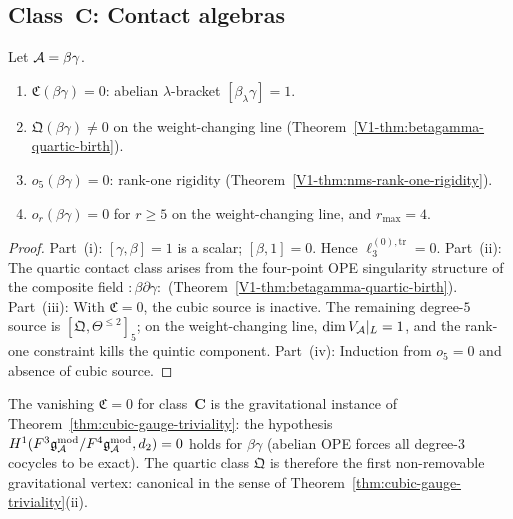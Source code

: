 
\subsection{Class~$\mathbf{C}$: Contact algebras}

\begin{theorem}
\ClaimStatusProvedElsewhere
{}
Let $\mathcal{A} = \beta\gamma$.
\begin{enumerate}[label=\textup{(\roman*)}]
\item $\mathfrak{C}(\beta\gamma) = 0$: abelian
 $\lambda$-bracket $[\beta_\lambda\gamma] = 1$.
\item $\mathfrak{Q}(\beta\gamma) \neq 0$ on the
 weight-changing line
 \textup{(}Theorem~\ref{V1-thm:betagamma-quartic-birth}\textup{)}.
\item $o_5(\beta\gamma) = 0$: rank-one rigidity
 \textup{(}Theorem~\ref{V1-thm:nms-rank-one-rigidity}\textup{)}.
\item $o_r(\beta\gamma) = 0$ for $r \geq 5$ on the
 weight-changing line, and $r_{\max} = 4$.
\end{enumerate}
\end{theorem}

\begin{proof}
Part~(i): $[\gamma,\beta] = 1$ is a scalar; $[\beta, 1] = 0$.
Hence $\ell_3^{(0),\mathrm{tr}} = 0$.
Part~(ii): The quartic contact class arises from the
four-point OPE singularity structure of the composite field
$:\!\beta\partial\gamma\!:$
(Theorem~\ref{V1-thm:betagamma-quartic-birth}).
Part~(iii): With $\mathfrak{C} = 0$, the cubic source is
inactive. The remaining degree-$5$ source is
$[\mathfrak{Q}, \Theta^{\leq 2}]_5$; on the weight-changing
line, $\dim V_{\mathcal{A}}|_L = 1$, and the rank-one constraint
kills the quintic component.
Part~(iv): Induction from $o_5 = 0$ and absence of cubic
source.
\end{proof}

\begin{proposition}
\ClaimStatusProvedHere
{}
The vanishing $\mathfrak{C} = 0$ for class~$\mathbf{C}$ is
the gravitational instance of
Theorem~\ref{thm:cubic-gauge-triviality}: the hypothesis
$H^1(F^3\mathfrak{g}_{\mathcal{A}}^{\mathrm{mod}}/F^4\mathfrak{g}_{\mathcal{A}}^{\mathrm{mod}}, d_2) = 0$ holds for $\beta\gamma$
\textup{(}abelian OPE forces all degree-$3$ cocycles to be
exact\textup{)}. The quartic class $\mathfrak{Q}$ is therefore
the first non-removable gravitational vertex: canonical in the
sense of Theorem~\ref{thm:cubic-gauge-triviality}(ii).
\end{proposition}

